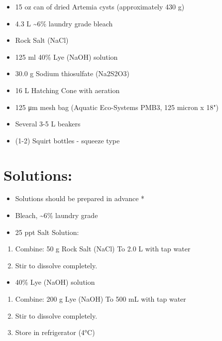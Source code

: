 \documentclass[
]{book}
\providecommand{\tightlist}{%
  \setlength{\itemsep}{0pt}\setlength{\parskip}{0pt}}
\begin{document}
\begin{itemize}
\tightlist
\item
  15 oz can of dried Artemia cysts (approximately 430 g)
\item
  4.3 L \textasciitilde6\% laundry grade bleach
\item
  Rock Salt (NaCl)
\item
  125 ml 40\% Lye (NaOH) solution
\item
  30.0 g Sodium thiosulfate (Na2S2O3)
\item
  16 L Hatching Cone with aeration
\item
  125 μm mesh bag (Aquatic Eco-Systems PMB3, 125 micron x 18")
\item
  Several 3-5 L beakers
\item
  (1-2) Squirt bottles - squeeze type
\end{itemize}

\hypertarget{solutions-1}{%
\section{Solutions:}\label{solutions-1}}

\begin{itemize}
\item
  Solutions should be prepared in advance *
\item
  Bleach, \textasciitilde6\% laundry grade
\item
  25 ppt Salt Solution:
\end{itemize}

\begin{enumerate}
\def\labelenumi{\arabic{enumi}.}
\tightlist
\item
  Combine: 50 g Rock Salt (NaCl) To 2.0 L with tap water
\item
  Stir to dissolve completely.
\end{enumerate}

\begin{itemize}
\tightlist
\item
  40\% Lye (NaOH) solution
\end{itemize}

\begin{enumerate}
\def\labelenumi{\arabic{enumi}.}
\tightlist
\item
  Combine: 200 g Lye (NaOH) To 500 mL with tap water
\item
  Stir to dissolve completely.
\item
  Store in refrigerator (4°C)
\end{enumerate}
\end{document}
